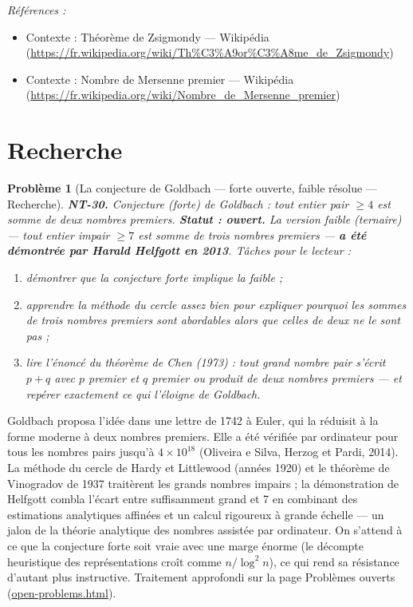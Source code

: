 \documentclass[11pt]{article}
\newtheorem{problem}{Problème}
\newenvironment{refs}{\par\small\noindent\emph{Références :}\begin{itemize}\setlength\itemsep{0pt}}{\end{itemize}\normalsize}
\begin{document}
\begin{refs}
\item Contexte : Théorème de Zsigmondy --- Wikipédia (\url{https://fr.wikipedia.org/wiki/Th%C3%A9or%C3%A8me_de_Zsigmondy})
\item Contexte : Nombre de Mersenne premier --- Wikipédia (\url{https://fr.wikipedia.org/wiki/Nombre_de_Mersenne_premier})
\end{refs}

\bigskip


\section*{Recherche}

\begin{problem}[{La conjecture de Goldbach --- forte ouverte, faible résolue --- Recherche}]
\textbf{NT-30.} Conjecture (forte) de Goldbach : tout entier pair
$\ge 4$ est somme de deux nombres premiers. \textbf{Statut : ouvert.} La version faible (ternaire) ---
tout entier impair $\ge 7$ est somme de trois nombres premiers --- \textbf{a été démontrée par Harald
Helfgott en 2013}. Tâches pour le lecteur :
\begin{enumerate}
\item[(i)] démontrer que la conjecture forte
implique la faible ;
\item[(ii)] apprendre la méthode du cercle assez bien pour expliquer pourquoi les sommes de
\textit{trois} nombres premiers sont abordables alors que celles de deux ne le sont pas ;
\item[(iii)] lire l'énoncé
du théorème de Chen (1973) : tout grand nombre pair s'écrit $p + q$ avec $p$ premier et
$q$ premier ou produit de deux nombres premiers --- et repérer exactement ce qui l'éloigne de
Goldbach.
\end{enumerate}

\end{problem}

\noindent Goldbach proposa l'idée dans une lettre de 1742 à Euler, qui la réduisit
à la forme moderne à deux nombres premiers. Elle a été vérifiée par ordinateur pour tous les nombres
pairs jusqu'à $4 \times 10^{18}$ (Oliveira e Silva, Herzog et Pardi, 2014). La méthode du cercle de
Hardy et Littlewood (années 1920) et le théorème de Vinogradov de 1937 traitèrent les grands nombres
impairs ; la démonstration de Helfgott combla l'écart entre \og{} suffisamment grand \fg{} et 7 en
combinant des estimations analytiques affinées et un calcul rigoureux à grande échelle --- un jalon de
la théorie analytique des nombres assistée par ordinateur. On s'attend à ce que la conjecture forte
soit vraie avec une marge énorme (le décompte heuristique des représentations croît comme
$n/\log^2 n$), ce qui rend sa résistance d'autant plus instructive. Traitement approfondi sur la
page Problèmes ouverts (\url{open-problems.html}).
\end{document}
